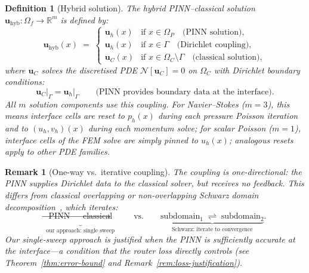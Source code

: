 \documentclass[11pt]{article}
\newtheorem{definition}[theorem]{Definition}
\newtheorem{remark}[theorem]{Remark}
\newcommand{\R}{\mathbb{R}}
\newcommand{\Ncal}{\mathcal{N}}
\begin{document}
\begin{definition}[Hybrid solution]\label{def:hybrid}
The hybrid PINN--classical solution
$\mathbf{u}_{\mathrm{hyb}} \colon \Omega_f \to \R^m$ is defined by:
\begin{equation}\label{eq:hybrid}
  \mathbf{u}_{\mathrm{hyb}}(x) \;=\;
  \begin{cases}
    \mathbf{u}_h(x) & \text{if } x \in \Omega_P
      \quad\text{(PINN solution)}, \\[3pt]
    \mathbf{u}_h(x) & \text{if } x \in \Gamma
      \quad\text{(Dirichlet coupling)}, \\[3pt]
    \mathbf{u}_C(x) & \text{if } x \in \Omega_C \setminus \Gamma
      \quad\text{(classical solution)},
  \end{cases}
\end{equation}
where $\mathbf{u}_C$ solves the discretised PDE $\Ncal[\mathbf{u}_C] = 0$ on
$\Omega_C$ with Dirichlet boundary conditions:
\begin{equation}\label{eq:cfd-bc}
  \mathbf{u}_C\big|_\Gamma = \mathbf{u}_h\big|_\Gamma
  \qquad\text{(PINN provides boundary data at the interface)}.
\end{equation}
All $m$ solution components use this coupling.  For Navier--Stokes ($m = 3$), this
means interface cells are reset to $p_h(x)$ during each pressure Poisson iteration
and to $(u_h, v_h)(x)$ during each momentum solve; for scalar Poisson ($m = 1$),
interface cells of the FEM solve are simply pinned to $u_h(x)$; analogous resets
apply to other PDE families.
\end{definition}

\begin{remark}[One-way vs.\ iterative coupling]\label{rem:coupling}
The coupling is \emph{one-directional}: the PINN supplies Dirichlet data to the
classical solver, but receives no feedback.  This differs from classical
overlapping or non-overlapping Schwarz domain
decomposition~\cite{toselli2005domain}, which iterates:
\begin{equation}\label{eq:schwarz-comparison}
  \underbrace{\text{PINN} \;\longrightarrow\; \text{classical}}_{\text{our approach: single sweep}}
  \qquad\text{vs.}\qquad
  \underbrace{\text{subdomain}_1 \;\rightleftharpoons\; \text{subdomain}_2}_{\text{Schwarz: iterate to convergence}}.
\end{equation}
Our single-sweep approach is justified when the PINN is sufficiently accurate at
the interface---a condition that the router loss directly controls (see
Theorem~\ref{thm:error-bound} and Remark~\ref{rem:loss-justification}).
\end{remark}
\end{document}
